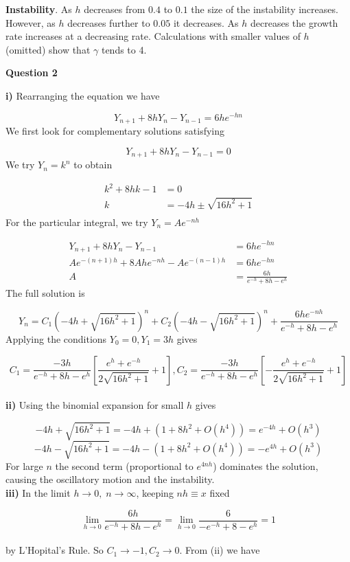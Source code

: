 \documentclass[14pt]{extarticle}
\begin{document}
\noindent \textbf{Instability}. As $h$ decreases from $0.4$ to $0.1$ the size of the instability increases. However, as $h$ decreases further to $0.05$ it decreases. As $h$ decreases the growth rate increases at a decreasing rate. Calculations with smaller values of $h$ (omitted) show that $\gamma$ tends to 4. 
\\
\begin{center}
\textbf{Question 2}
\end{center} 
\hfill

\noindent \textbf{i)} Rearranging the equation we have

\[Y_{n+1}+8hY_n-Y_{n-1} = 6he^{-hn}\]
We first look for complementary solutions satisfying 

\[Y_{n+1}+8hY_n-Y_{n-1} = 0\]
We try $Y_n = k^n$ to obtain

\begin{align*}
k^2 + 8hk - 1 &= 0\\
k &= -4h \pm \sqrt{16h^2+1}\\
\end{align*}
For the particular integral, we try $Y_n = Ae^{-nh}$

\begin{align*}
Y_{n+1}+8hY_n-Y_{n-1} &  = 6he^{-hn}\\
Ae^{-(n+1)h}+8Ahe^{-nh}-Ae^{-(n-1)h} &= 6he^{-hn}\\
A &= \frac{6h}{e^{-h}+8h-e^{h}}
\end{align*}
The full solution is

\[Y_n = C_1\left(-4h+\sqrt{16h^2+1}\right)^n+C_2\left(-4h-\sqrt{16h^2+1}\right)^n+\frac{6he^{-nh}}{e^{-h}+8h-e^{h}}\]
Applying the conditions $Y_0 = 0, Y_1 = 3h$ gives

\[C_1 = \frac{-3h}{e^{-h}+8h-e^{h}}\left[\frac{e^h+e^{-h}}{2\sqrt{16h^2+1}}+1\right], C_2 = \frac{-3h}{e^{-h}+8h-e^{h}}\left[-\frac{e^h+e^{-h}}{2\sqrt{16h^2+1}}+1\right]\]\\
\textbf{ii)} Using the binomial expansion for small $h$ gives

\[-4h+\sqrt{16h^2+1} = -4h + (1+ 8h^2 + O(h^4)) = e^{-4h}+O(h^3)\]
\[-4h-\sqrt{16h^2+1} = -4h - (1+ 8h^2 + O(h^4)) = -e^{4h}+O(h^3)\]
For large $n$ the second term (proportional to $e^{4nh}$) dominates the solution, causing the oscillatory motion and the instability.\\

\noindent \textbf{iii)} In the limit $h \rightarrow 0,\; n \rightarrow \infty$, keeping $nh \equiv x$ fixed

\[\lim_{h\to 0} \frac{6h}{e^{-h}+8h-e^h} = \lim_{h\to 0} \frac{6}{-e^{-h}+8-e^h} = 1\]\\
by L'Hopital's Rule. So $C_1 \rightarrow -1, C_2 \rightarrow 0$. From (ii) we have 
\end{document}

